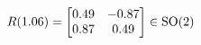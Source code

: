 \documentclass[preview]{standalone}
\begin{document}
\begin{align*}
\special{dvisvgm:raw <g id='unique000'>}R(1.06) = \begin{bmatrix} 0.49 & -0.87 \\ 0.87 & 0.49 \end{bmatrix} \in \text{SO}(2)\special{dvisvgm:raw </g>}
\end{align*}
\end{document}

